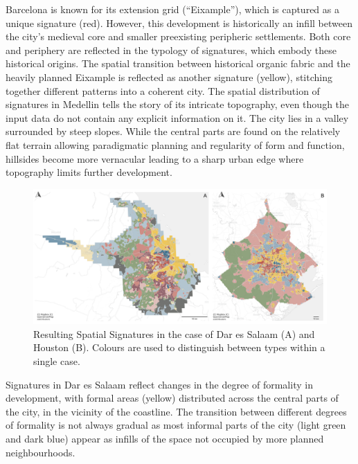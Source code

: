 Barcelona is known for its extension grid (``Eixample''), which is captured as
a unique signature (red).
However, this development is historically an infill between the city's medieval core and
smaller preexisting peripheric settlements. Both core and periphery are
reflected in the typology of signatures, which embody these historical
origins. The spatial transition between historical organic fabric and the
heavily planned
Eixample is reflected as another signature (yellow), stitching together different patterns into a coherent city.
The spatial distribution of signatures in Medellin tells the story of its intricate
topography, even though the input data do not contain any explicit information
on it. The
city lies in a valley surrounded by steep slopes. While the central parts are
found on the
relatively flat terrain allowing paradigmatic planning and regularity of form
and function, hillsides become more vernacular leading to a sharp urban edge where
topography limits further development.

\begin{figure}
    \includegraphics[width=\linewidth]{figures/maps2.png}
    \caption{Resulting Spatial Signatures in the case of Dar es Salaam (A) and Houston (B).
    Colours are used to distinguish between types within a single case.}
    \label{fig:maps2}
\end{figure}

Signatures in Dar es Salaam reflect changes in the degree of formality in development, with
formal areas (yellow) distributed across the central parts of the city, in the vicinity
of the
coastline. The transition between different degrees of formality is not always gradual
as most informal parts of the city (light green and dark blue) appear as
infills of the space not occupied by more planned neighbourhoods.

